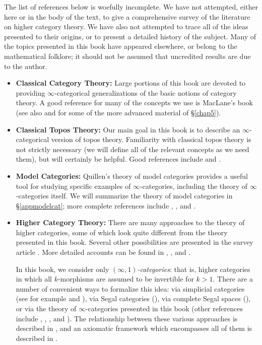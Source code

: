\begin{warning2}
The list of references below is woefully incomplete. We have not attempted, either here or in the body of the text, to give a comprehensive survey of the literature on higher category theory. We have also not attempted to trace all of the ideas presented to their origins, or to present a detailed history of the subject. Many of the topics presented in this book have appeared elsewhere, or belong to the mathematical folklore; it should not be assumed that uncredited results are due to the author.
\end{warning2}

\begin{itemize}
\item {\bf Classical Category Theory:} Large portions of this book are devoted to providing $\infty$-categorical generalizations of the basic notions of category theory. A good reference for many of the concepts we use is MacLane's book \cite{maclane} (see also \cite{adamek} and \cite{makkai} for some of the more advanced material of \S \ref{chap5}).

\item {\bf Classical Topos Theory:} Our main goal in this book is to describe an $\infty$-categorical version of
topos theory. Familiarity with classical topos theory is not strictly necessary (we will define all of the relevant concepts as we need them), but will certainly be helpful. Good references include \cite{SGA} and \cite{where}.

\item {\bf Model Categories:} Quillen's theory of model categories provides a useful tool for studying
specific examples of $\infty$-categories, including the theory of $\infty$-categories itself.
We will summarize the theory of model categories in \S \ref{appmodelcat}; more complete
references include \cite{hovey}, \cite{hirschhorn}, and \cite{goerssjardine}.

\item {\bf Higher Category Theory:} There are many approaches to the theory of higher categories, some of which look quite different from the theory presented in this book. Several other possibilities are presented in the survey article \cite{leinster}. More detailed accounts can be found in \cite{leinster2}, 
\cite{simpson2}, and \cite{tamsamani}. 

In this book, we consider only {\it $(\infty,1)$-categories}: that is, higher categories in which all $k$-morphisms are assumed to be invertible for $k > 1$. There are a number of convenient ways to formalize this idea: via simplicial categories (see for example \cite{dwyerkan} and \cite{bergner}), via
Segal categories (\cite{simpson2}), via complete Segal spaces (\cite{completesegal}), or via
the theory of $\infty$-categories presented in this book (other references include \cite{joyalpub},
\cite{joyalnotpub}, \cite{nichols}, and \cite{quasicat}). The relationship between these various approaches is described in \cite{bergner2}, and an axiomatic framework which encompasses all of them is described in \cite{toenchar}.


\end{itemize}
